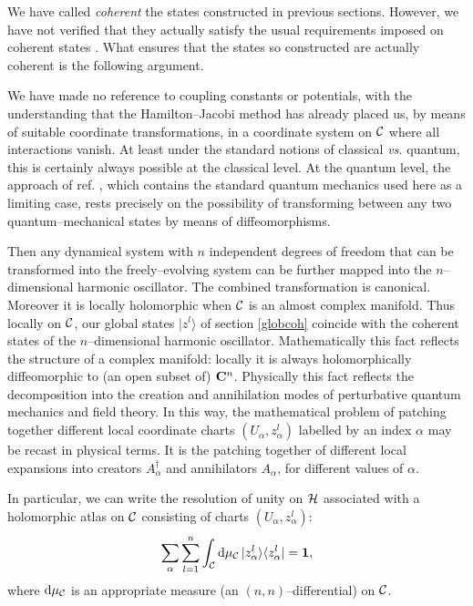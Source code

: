 \documentclass[a4paper,a4paper]{article}
\begin{document}
We have called {\it coherent} the states constructed in previous sections.
However, we have not verified that they actually satisfy the usual requirements 
imposed on coherent states \cite{COHST}. What ensures that the states so 
constructed are actually coherent is the following argument. 

We have made no reference to coupling constants or potentials, with the understanding 
that the Hamilton--Jacobi method has already placed us, by means of suitable coordinate 
transformations, in a coordinate system on ${\cal C}$ where all interactions vanish. 
At least under the standard notions of classical {\it vs.} quantum, this is certainly 
always possible at the classical level. At the quantum level, the approach of 
ref. \cite{MATONE}, which contains the standard quantum mechanics used here
as a limiting case, rests precisely on the possibility of transforming between any 
two quantum--mechanical states by means of diffeomorphisms. 

Then any dynamical system with $n$ independent degrees of freedom that can be transformed 
into the freely--evolving system can be further mapped into the $n$--dimensional harmonic 
oscillator. The combined transformation is canonical. Moreover it is locally holomorphic when 
${\cal C}$ is an almost complex manifold. Thus locally on ${\cal C}$, our global states 
$|z^l\rangle$ of section \ref{globcoh} coincide with the coherent states of the 
$n$--dimensional harmonic oscillator. Mathematically this fact reflects the structure 
of a complex manifold: locally it is always holomorphically diffeomorphic to 
(an open subset of) ${\bf C}^n$. Physically this fact reflects 
the decomposition into the creation and annihilation modes of perturbative quantum 
mechanics and field theory. In this way, the mathematical problem of patching together different 
local coordinate charts $(U_{\alpha}, z^l_{\alpha})$ labelled by an index 
$\alpha$ may be recast in physical terms. It is the patching together of different 
local expansions into creators $A^{\dagger}_{\alpha}$ and annihilators $A_{\alpha}$, 
for different values of $\alpha$.

In particular, we can write the resolution of unity on ${\cal H}$ 
associated with a holomorphic atlas on ${\cal C}$ consisting of charts
$(U_{\alpha},z^l_{\alpha})$:
\begin{equation}
\sum_{\alpha}\sum_{l=1}^n\int_{\cal C} {\rm d}\mu_{\cal C}\, |z^l_{\alpha}\rangle  \langle 
z^l_{\alpha}|= {\bf 1},
\label{res}
\end{equation}
where ${\rm d}\mu_{\cal C}$ is an appropriate measure (an 
$(n,n)$--differential) on ${\cal C}$. 
\end{document}
